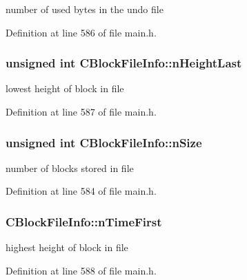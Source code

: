 number of used bytes in the undo file 



Definition at line 586 of file main.\+h.

\hypertarget{class_c_block_file_info_aabbcf808931e7eaf2278b3d7172fad3a}{}
\subsubsection[{n\+Height\+Last}]{\setlength{\rightskip}{0pt plus 5cm}unsigned int C\+Block\+File\+Info\+::n\+Height\+Last}\label{class_c_block_file_info_aabbcf808931e7eaf2278b3d7172fad3a}


lowest height of block in file 



Definition at line 587 of file main.\+h.

\hypertarget{class_c_block_file_info_afb13102ba49548c24812a4236851c3a9}{}
\subsubsection[{n\+Size}]{\setlength{\rightskip}{0pt plus 5cm}unsigned int C\+Block\+File\+Info\+::n\+Size}\label{class_c_block_file_info_afb13102ba49548c24812a4236851c3a9}


number of blocks stored in file 



Definition at line 584 of file main.\+h.

\hypertarget{class_c_block_file_info_a0e928257d1f003ede485ce49e8cf9189}{}
\subsubsection[{n\+Time\+First}]{ C\+Block\+File\+Info\+::n\+Time\+First}\label{class_c_block_file_info_a0e928257d1f003ede485ce49e8cf9189}


highest height of block in file 



Definition at line 588 of file main.\+h.

